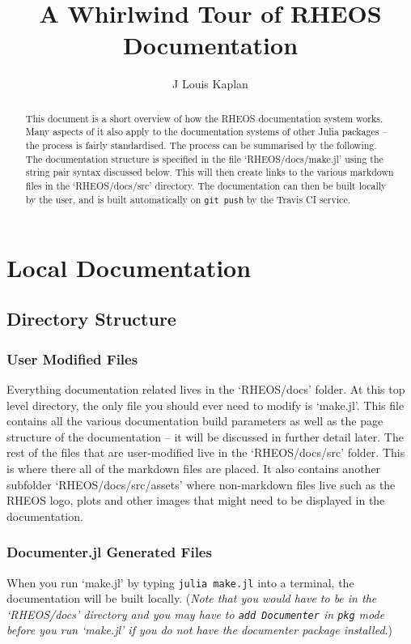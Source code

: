 \documentclass[]{article}
\title{A Whirlwind Tour of RHEOS Documentation}
\author{J Louis Kaplan}
\newcommand{\cod}[1]{\colorbox{light-gray}{\texttt{#1}}}
\begin{document}
	
\date{}
\maketitle

\begin{abstract}
This document is a short overview of how the RHEOS documentation system works. Many aspects of it also apply to the documentation systems of other Julia packages -- the process is fairly standardised. The process can be summarised by the following. The documentation structure is specified in the file `RHEOS/docs/make.jl' using the string pair syntax discussed below. This will then create links to the various markdown files in the `RHEOS/docs/src' directory. The documentation can then be built locally by the user, and is built automatically on \cod{git push} by the Travis CI service.
\end{abstract}

\section{Local Documentation}
\subsection{Directory Structure}
\subsubsection{User Modified Files}
Everything documentation related lives in the `RHEOS/docs' folder. At this top level directory, the only file you should ever need to modify is `make.jl'. This file contains all the various documentation build parameters as well as the page structure of the documentation -- it will be discussed in further detail later. The rest of the files that are user-modified live in the `RHEOS/docs/src' folder. This is where there all of the markdown files are placed. It also contains another subfolder `RHEOS/docs/src/assets' where non-markdown files live such as the RHEOS logo, plots and other images that might need to be displayed in the documentation.
\subsubsection{Documenter.jl Generated Files}
When you run `make.jl' by typing \cod{julia make.jl} into a terminal, the documentation will be built locally. (\textit{Note that you would have to be in the `RHEOS/docs' directory and you may have to \cod{add Documenter} in \cod{pkg} mode before you run `make.jl' if you do not have the documenter package installed}.)\\
\end{document}

